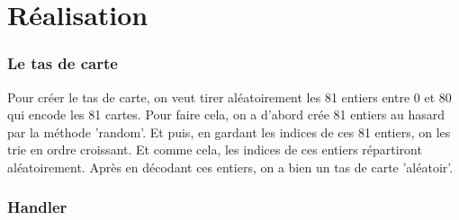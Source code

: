 \documentclass[paper=a4, french]{scrartcl} %
\numberwithin{equation}{section} %
\numberwithin{figure}{section} %
\numberwithin{table}{section} %
\begin{document}

\section{Réalisation}

	\subsubsection{Le tas de carte}
	Pour créer le tas de carte, on veut tirer aléatoirement les 81 entiers entre 0 et 80 qui encode les 81 cartes. Pour faire cela, on a d'abord crée 81 entiers au hasard par la méthode 'random'. Et puis, en gardant les indices de ces 81 entiers, on les trie en ordre croissant. Et comme cela, les indices de ces entiers répartiront aléatoirement. Après en décodant ces entiers, on a bien un tas de carte 'aléatoir'.
	
	\subsubsection{Handler}
\end{document}

